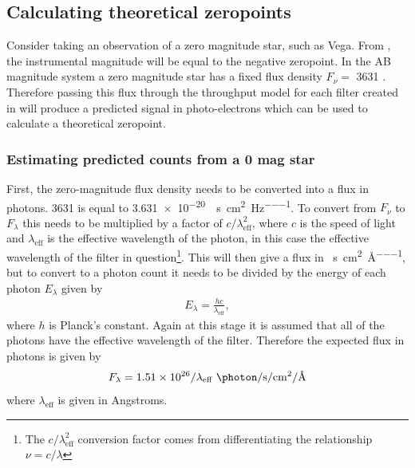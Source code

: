 \begin{colsection}
\begin{colsection}
\end{colsection}

\newpage
\subsection{Calculating theoretical zeropoints}
\label{sec:model_zeropoints}
\begin{colsection}

Consider taking an observation of a zero magnitude star, such as Vega. From , the instrumental magnitude will be equal to the negative zeropoint. In the AB magnitude system a zero magnitude star has a fixed flux density $F_\nu = $ \SI{3631}{\jansky} \citep{Sloan_filters}. Therefore passing this flux through the throughput model for each filter created in  will produce a predicted signal in photo-electrons which can be used to calculate a theoretical zeropoint.

\subsubsection{Estimating predicted counts from a 0 mag star}

First, the zero-magnitude flux density needs to be converted into a flux in photons. \SI{3631}{\jansky} is equal to \SI{3.631e-20}{\erg\per\second\per\centi\metre\squared\per\hertz}. To convert from $F_\nu$ to $F_\lambda$ this needs to be multiplied by a factor of $c/\lambda_\text{eff}^2$, where $c$ is the speed of light and $\lambda_\text{eff}$ is the effective wavelength of the photon, in this case the effective wavelength of the filter in question\footnote{The $c/\lambda_\text{eff}^2$ conversion factor comes from differentiating the relationship $\nu = c/\lambda$}. This will then give a flux in \si{\erg\per\second\per\centi\metre\squared\per\angstrom}, but to convert to a photon count it needs to be divided by the energy of each photon $E_\lambda$ given by
%
\begin{equation}
    \begin{split}
        E_\lambda = \frac{hc}{\lambda_\text{eff}},
    \end{split}
    \label{eq:photon_energy}
\end{equation}
%
where $h$ is Planck's constant. Again at this stage it is assumed that all of the photons have the effective wavelength of the filter. Therefore the expected flux in photons is given by
%
\begin{equation}
    \begin{split}
        F_\lambda = 1.51 \times 10^{26}/\lambda_\text{eff}~\si{\photon\per\second\per\centi\metre\squared\per\angstrom}
    \end{split}
    \label{eq:zero-mag_photons}
\end{equation}
%
where $\lambda_\text{eff}$ is given in Angstroms.


\end{colsection}
\end{colsection}
